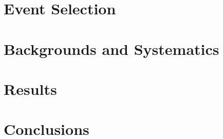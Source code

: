 \documentclass{brandeis-dissertation}
\begin{document}
\chapter{Event Selection}
\label{sec:EventSelection}

\clearpage
\chapter{Backgrounds and Systematics}
\label{sec:BackgroundsSys}

\clearpage
\chapter{Results}
\label{sec:Results}

\clearpage
%

\clearpage
\chapter{Conclusions}
\label{sec:conclusion}

\clearpage



\clearpage
\end{document}
